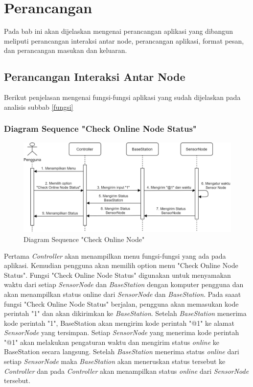 \chapter{Perancangan}

Pada bab ini akan dijelaskan mengenai perancangan aplikasi yang dibangun meliputi perancangan interaksi antar node, perancangan aplikasi, format pesan, dan perancangan masukan dan keluaran.

\section{Perancangan Interaksi Antar Node}
\label{fungsi_interaksi}
Berikut penjelasan mengenai fungsi-fungsi aplikasi yang sudah dijelaskan pada analisis subbab \ref{fungsi}

\subsection{Diagram Sequence "Check Online Node Status"}
\begin{figure}[H] 
	\centering  
	\includegraphics[scale=0.4]{Gambar/Check Online Node.jpg}  
	\caption[Diagram Sequence "Check Online Node"]{Diagram Sequence "Check Online Node"}
	\label{fig:check_online_node} 
\end{figure}

Pertama \textit{Controller} akan menampilkan menu fungsi-fungsi yang ada pada aplikasi. Kemudian pengguna akan memilih option menu "Check Online Node Status". Fungsi "Check Online Node Status" digunakan untuk menyamakan waktu dari setiap \textit{SensorNode} dan \textit{BaseStation} dengan komputer pengguna dan akan menampilkan status online dari \textit{SensorNode} dan \textit{BaseStation}. Pada saaat fungsi "Check Online Node Status" berjalan, pengguna akan memasukan kode perintah "1" dan akan dikirimkan ke \textit{BaseStation}. Setelah \textit{BaseStation} menerima kode perintah "1", BaseStation akan mengirim kode perintah "@1" ke alamat \textit{SensorNode} yang tersimpan. Setiap \textit{SensorNode} yang menerima kode perintah "@1" akan melakukan pengaturan waktu dan mengirim status \textit{online} ke BaseStation secara langsung. Setelah \textit{BaseStation} menerima status \textit{online} dari setiap \textit{SensorNode} maka \textit{BaseStation} akan meneruskan status tersebut ke \textit{Controller} dan pada \textit{Controller} akan menampilkan status \textit{online} dari \textit{SensorNode} tersebut.

